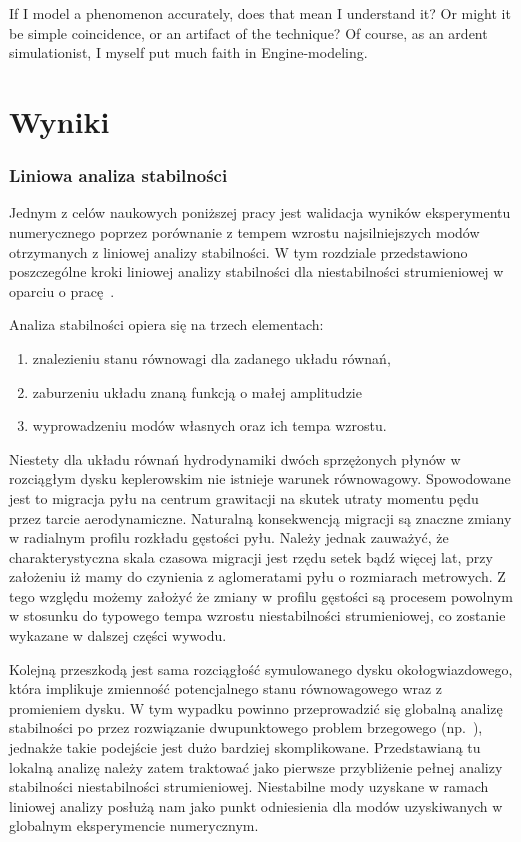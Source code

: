\begin{savequote}[75mm]
   If I model a phenomenon accurately, does that mean I understand it? Or might it be simple coincidence, or an artifact
   of the technique? Of course, as an ardent simulationist, I myself put much faith in Engine-modeling.
\end{savequote}

\chapter{Wyniki}

\subsection{Liniowa analiza stabilności}
\label{sec:lsa}
Jednym z celów naukowych poniższej pracy jest walidacja wyników eksperymentu
numerycznego poprzez porównanie z tempem wzrostu najsilniejszych modów
otrzymanych z liniowej analizy stabilności. W tym rozdziale przedstawiono
poszczególne kroki liniowej analizy stabilności dla niestabilności strumieniowej
w oparciu o pracę~\citep{YG05}.

Analiza stabilności opiera się na trzech elementach:
\begin{enumerate}
   \item znalezieniu stanu równowagi dla zadanego układu równań,
   \item zaburzeniu układu znaną funkcją o małej amplitudzie 
   \item wyprowadzeniu modów własnych oraz ich tempa wzrostu.
\end{enumerate}
Niestety dla układu równań hydrodynamiki dwóch sprzężonych płynów w rozciągłym
dysku keplerowskim nie istnieje warunek równowagowy. Spowodowane jest to
migracja pyłu na centrum grawitacji na skutek utraty momentu pędu przez tarcie
aerodynamiczne. Naturalną konsekwencją migracji są znaczne zmiany w radialnym
profilu rozkładu gęstości pyłu. Należy jednak zauważyć, że charakterystyczna
skala czasowa migracji jest rzędu setek bądź więcej lat, przy założeniu iż mamy
do czynienia z aglomeratami pyłu o rozmiarach metrowych. Z tego względu możemy
założyć że zmiany w profilu gęstości są procesem powolnym w stosunku do typowego
tempa wzrostu niestabilności strumieniowej, co zostanie wykazane w dalszej
części wywodu.

Kolejną przeszkodą jest sama rozciągłość symulowanego dysku okołogwiazdowego,
która implikuje zmienność potencjalnego stanu równowagowego wraz z promieniem
dysku. W tym wypadku powinno przeprowadzić się globalną analizę stabilności po
przez rozwiązanie dwupunktowego problem brzegowego (np.~\cite{PHM04, KH06}),
jednakże takie podejście jest dużo bardziej skomplikowane. Przedstawianą tu
lokalną analizę należy zatem traktować jako pierwsze przybliżenie pełnej analizy
stabilności niestabilności strumieniowej. Niestabilne mody uzyskane w ramach
liniowej analizy posłużą nam jako punkt odniesienia dla modów uzyskiwanych w
globalnym eksperymencie numerycznym.


